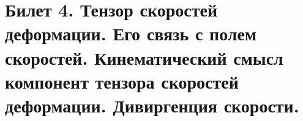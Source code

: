 \newpage
\section{Билет 4. Тензор скоростей деформации. Его связь с полем скоростей. Кинематический смысл компонент тензора скоростей деформации. Дивиргенция скорости.}